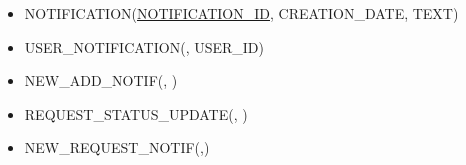 \documentclass{article}
\begin{document}
\begin{flushleft}
\begin{latin}
\begin{itemize}
            \item NOTIFICATION(\underline{NOTIFICATION\_ID}, CREATION\_DATE, TEXT)
            \item USER\_NOTIFICATION(\underline{}, USER\_ID)
            \item NEW\_ADD\_NOTIF(\underline{}, )
            \item REQUEST\_STATUS\_UPDATE(\underline{}, )
            \item NEW\_REQUEST\_NOTIF(\underline{},)
        \end{itemize}
    \end{latin}
\end{flushleft}
\end{document}
